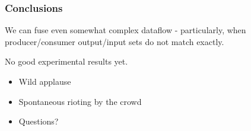 \documentclass{beamer}
\begin{document}
\begin{frame}[fragile,t]
  \frametitle{Conclusions}

  We can fuse even somewhat complex dataflow - particularly, when
  producer/consumer output/input sets do not match exactly.

  No good experimental results yet.

  \pause
  \begin{itemize}
    \item Wild applause
    \item Spontaneous rioting by the crowd
    \item Questions?
  \end{itemize}

\end{frame}
\end{document}
